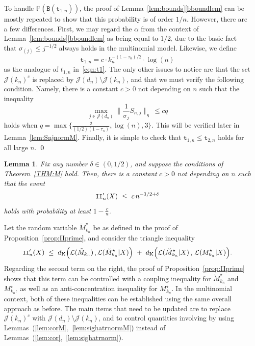 \documentclass[aos,preprint]{imsart}
\numberwithin{equation}{section}
\theoremstyle{plain}
\newtheorem{lemma}{Lemma}[section]
\renewcommand{\hat}[1]{\widehat{#1}}
\newcommand{\bII}{\textup{\texttt{II}}}
\newcommand{\dK}{d_{\textup{K}}}
\newcommand{\J}{\mathcal{J}}
\renewcommand{\P}{\mathbb{P}}
\renewcommand{\L}{\mathcal{L}}
\newcommand{\ts}{\textstyle}
\newcommand{\1}{{\bf{1}}}
\newcommand{\0}{\mathbf{0}}
\begin{document}
To handle $\P(\texttt{B}(\texttt{t}_{1,n}))$, the proof of Lemma~\ref{lem:bounds}\eqref{bboundlem} can be mostly repeated to show that this probability is of order $1/n$. However, there are a few differences. First, we may regard the $\alpha$ from the context of Lemma~\ref{lem:bounds}\eqref{bboundlem} as being equal to $1/2$, due to the basic fact that $\sigma_{(j)}\leq  j^{-1/2}$ always holds in the multinomial model. Likewise, we define
 \begin{equation}
 \texttt{t}_{1,n}=c\cdot k_n^{-(1-\tau_n)/2}\cdot \log(n)  
\end{equation}
as the analogue of $t_{1,n}$ in~\eqref{eqn:t1}. The only other issues to notice are that the set $\J(k_n)^c$ is replaced by $\J(d_n)\setminus\J(k_n)$, and that we must verify the following condition. Namely, there is a constant $c>0$ not depending on $n$ such that the inequality
 $$\max_{j\in\J(d_n)} \big\|\ts\frac{1}{\sigma_j}S_{n,j}\big\|_q \ \leq c q$$
%
 holds when $q=\max\{\frac{2}{(1/2)(1-\tau_n)},\log(n),3\}$. This will be verified later in Lemma~\ref{lem:SnjnormM}. Finally, it is simple to check that  $\texttt{t}_{1,n}  \leq \texttt{t}_{2,n}$ holds for all large $n$. \qed
~\\

\begin{lemma}\label{lem:IIprimeM}
Fix any number $\delta\in(0,1/2)$, and suppose the conditions of Theorem~\ref{THM:M} hold. Then, there is a constant $c>0$ not depending on $n$ such that the event
\begin{equation}
\bII_n'(X) \ \leq \ c\, n^{-1/2+\delta}
\end{equation}
holds with probability at least $1-\frac cn$.
\end{lemma}

\proof Let the random variable $\breve M_{k_n}^{\star}$ be as defined in the proof of Proposition~\ref{prop:IIprime}, and consider the triangle inequality
 \begin{equation}\label{eqn:IIprimeM}
 \small
\bII_n'(X) \ \leq \ \dK\Big(\L(\tilde M_{k_n})\, , \L(\breve M_{k_n}^{\star}|X)\Big) \ + \ \dK \Big(\L(\breve M_{k_n}^{\star}|X) \, , \, \L(M_{k_n}^{\star}|X)\Big).
\end{equation}
Regarding the second term on the right, the proof of Proposition~\ref{prop:IIprime} shows that this term can be controlled with a coupling inequality for $\breve{M}_{k_n}^{\star}$ and $M_{k_n}^{\star}$, as well as an anti-concentration inequality for $M_{k_n}^{\star}$. In the multinomial context, both of these inequalities can be established using the same overall approach as before. The main items that need to be updated are to replace $\J(k_n)^c$ with $\J(d_n)\setminus \J(k_n)$, and to control quantities involving \smash{$\{\hat\sigma_j | j\in\J(d_n)\}$} by using Lemmas~(\ref{lem:corM},~\ref{lem:sighatrnormM}) instead of Lemmas~(\ref{lem:cor},~\ref{lem:sighatrnorm}).
\end{document}
